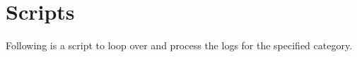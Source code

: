 
\newpage
\setcounter{secnumdepth}{0}
\section{Scripts}


Following is a script to loop over and process the logs for the 
specified category.
